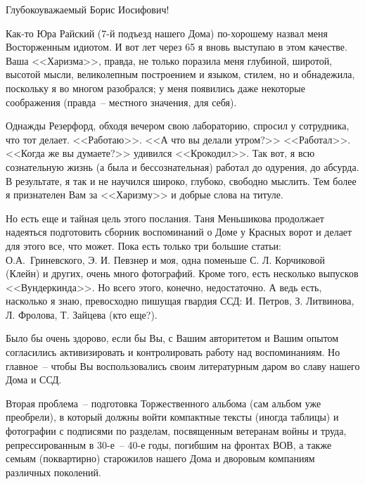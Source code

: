 \documentclass[utf8x, 12pt]{G7-32a} %
\begin{document}
\frontmatter %


\thispagestyle{empty} 

\begin{center}
    Глубокоуважаемый Борис Иосифович!
\end{center}

Как-то Юра Райский (7-й подъезд нашего Дома) по-хорошему назвал меня Восторженным идиотом. И вот лет через 65 я вновь выступаю в этом качестве. Ваша <<Харизма>>, правда, не только поразила меня глубиной, широтой, высотой мысли, великолепным построением и языком, стилем, но и обнадежила, поскольку я во многом разобрался; у меня появились даже некоторые соображения (правда~-- местного значения, для себя).

Однажды Резерфорд, обходя вечером свою лабораторию, спросил у сотрудника, что тот делает. <<Работаю>>. <<А что вы делали утром?>> <<Работал>>. <<Когда же вы думаете?>> удивился <<Крокодил>>. Так вот, я всю сознательную жизнь (а была и бессознательная) работал до одурения, до абсурда. В результате, я так и не научился широко, глубоко, свободно мыслить. Тем более я признателен Вам за <<Харизму>> и добрые слова на титуле.

Но есть еще и тайная цель этого послания. Таня Меньшикова продолжает надеяться подготовить сборник воспоминаний о Доме у Красных ворот и делает для этого все, что может. Пока есть только три большие статьи: О.А.~Гриневского, Э. И. Певзнер и моя, одна поменьше С. Л. Корчиковой (Клейн) и других, очень много фотографий. Кроме того, есть несколько выпусков <<Вундеркинда>>. Но всего этого, конечно, недостаточно. А ведь есть, насколько я знаю, превосходно пишущая гвардия ССД: И. Петров, З. Литвинова, Л. Фролова, Т. Зайцева (кто еще?).

Было бы очень здорово, если бы Вы, с Вашим авторитетом и Вашим опытом согласились активизировать и контролировать работу над воспоминаниям. Но главное~-- чтобы Вы воспользовались своим литературным даром во славу нашего Дома и ССД.

Вторая проблема~-- подготовка Торжественного альбома (сам альбом уже преобрели), в который должны войти компактные тексты (иногда таблицы) и фотографии с подписями по разделам, посвященным ветеранам войны и труда, репрессированным в 30-е~-- 40-е годы, погибшим на фронтах ВОВ, а также семьям (поквартирно) старожилов нашего Дома и дворовым компаниям различных поколений.
\end{document}
